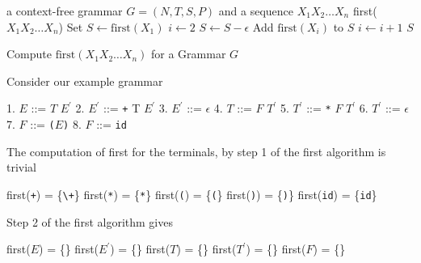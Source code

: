 \documentclass[8pt,a4paper,compress,handout]{beamer}
\newcommand{\mm}[1]{$#1$}
\newcommand{\expo}[2]{$#1^{#2}$}
\newenvironment{spaced}
{
\smallskip
\hspace{.5cm}
\begin{minipage}[c]{\textwidth}
}
{
\end{minipage}
\smallskip
}
\begin{document}
\begin{frame}[fragile]
\pause

\begin{algorithm}[H]
\begin{algorithmic}
\REQUIRE a context-free grammar $G = (N,T,S,P)$ and a sequence $X_1X_2 \dots X_n$
\ENSURE first($X_1X_2 \dots X_n$)
\STATE Set $S \gets \text{first}(X_1)$
\STATE $i \gets 2$
\STATE $S \gets S - \epsilon$
\STATE Add $\text{first}(X_i)$ to $S$
\STATE $i \gets i + 1$
\ENDWHILE
\RETURN $S$
\end{algorithmic}
\caption{Compute $\text{first}(X_1X_2 \dots X_n)$ for a Grammar $G$}
\end{algorithm}
\end{frame}

\begin{frame}[fragile]
\pause

Consider our example grammar

\text{ }
\begin{spaced}
\begin{production}
1. \mm{E}  ::= \mm{T} \expo{E}{\prime}
2. \expo{E}{\prime} ::= \lstinline{+} T \expo{E}{\prime}
3. \expo{E}{\prime} ::= \mm{\epsilon}
4. \mm{T}  ::= \mm{F} \expo{T}{\prime}
5. \expo{T}{\prime} ::= \lstinline{*} \mm{F} \expo{T}{\prime}
6. \expo{T}{\prime} ::= \mm{\epsilon}
7. \mm{F}  ::= \lstinline{(}\mm{E}\lstinline{)}
8. \mm{F}  ::= \lstinline{id}
\end{production}
\end{spaced}

\pause
\bigskip

The computation of first for the terminals, by step 1 of the first algorithm is trivial

\text{ }
\begin{spaced}
\begin{production}
first(\lstinline{+})  = \{\lstinline{\+}\}
first(\lstinline{*})  = \{\lstinline{*}\}
first(\lstinline{(})  = \{\lstinline{(}\}
first(\lstinline{)})  = \{\lstinline{)}\}
first(\lstinline{id}) = \{\lstinline{id}\}
\end{production}
\end{spaced}

\pause
\bigskip

Step 2 of the first algorithm gives

\text{ }
\begin{spaced}
\begin{production}
first(\mm{E})  = \{\}
first(\expo{E}{\prime}) = \{\}
first(\mm{T})  = \{\}
first(\expo{T}{\prime}) = \{\}
first(\mm{F})  = \{\}
\end{production}
\end{spaced}
\end{frame}
\end{document}
